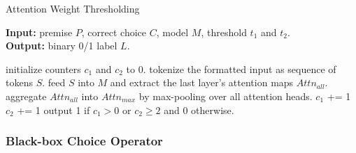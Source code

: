 {%
\begin{algorithm}
\small
	\caption{Attention Weight Thresholding}
	\label{AW}
\hspace*{0.02in} {\bf Input:} 
premise $P$, correct choice $C$, model $M$,  threshold $t_1$ and $t_2$. \\
\hspace*{0.02in} {\bf Output:}
binary 0/1 label $L$.
	\begin{algorithmic}[1]
		\State initialize counters $c_1$ and $c_2$ to 0.
		\State tokenize the formatted input as sequence of tokens $S$.
		\State feed $S$ into $M$ and extract the last layer's attention maps $Attn_{all}$.
		\State aggregate $Attn_{all}$ into $Attn_{max}$ by max-pooling over all attention heads.
				$c_1$ += 1
		\EndIf
				$c_2$ += 1
		\EndIf
		\EndFor
		\EndFor
		\State output 1 if $c_1>0$ or $c_2\geq 2$ and 0 otherwise.
	\end{algorithmic}
\end{algorithm}


\subsubsection*{Black-box Choice Operator}
\label{sec:proxy}
}%
%

